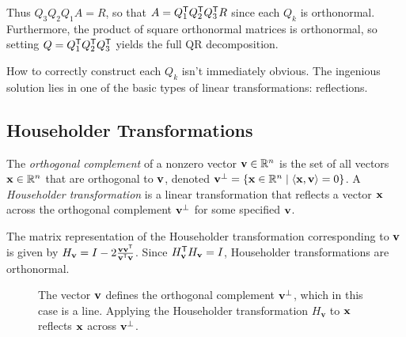 Thus $Q_3 Q_2 Q_1 A = R$, so that $A = Q_1^{\mathsf T} Q_2^{\mathsf T} Q_3^{\mathsf T} R$ since each $Q_k$ is orthonormal.
Furthermore, the product of square orthonormal matrices is orthonormal, so setting $Q = Q_1^{\mathsf T} Q_2^{\mathsf T} Q_3^{\mathsf T}$ yields the full QR decomposition.

How to correctly construct each $Q_k$ isn't immediately obvious.
The ingenious solution lies in one of the basic types of linear transformations: reflections.

\subsection*{Householder Transformations} %

The \emph{orthogonal complement} of a nonzero vector $\mathbf{v} \in \mathbb{R}^n$ is the set of all vectors $\mathbf{x} \in \mathbb{R}^n$ that are orthogonal to $\mathbf{v}$, denoted $\mathbf{v}^\perp = \{ \mathbf{x} \in \mathbb{R}^n \mid \langle \mathbf{x}, \mathbf{v} \rangle = 0 \}$.
A \emph{Householder transformation} is a linear transformation that reflects a vector $\mathbf{x}$ across the orthogonal complement $\mathbf{v}^\perp$ for some specified $\mathbf{v}$.

The matrix representation of the Householder transformation corresponding to $\mathbf{v}$ is given by $H_{\mathbf{v}} = I - 2\frac{\mathbf{v}\mathbf{v}^{\mathsf T}}{\mathbf{v}^{\mathsf T}\mathbf{v}}$.
Since $H_{\mathbf{v}}^{\mathsf T} H_{\mathbf{v}} = I$, Householder transformations are orthonormal.

\begin{figure}[H]
\centering
{}
\caption{The vector $\mathbf{v}$ defines the orthogonal complement $\mathbf{v}^\perp$, which in this case is a line.
Applying the Householder transformation $H_{\mathbf{v}}$ to $\mathbf{x}$ reflects $\mathbf{x}$ across $\mathbf{v}^\perp$.}
\label{fig:Householder_reflector}
\end{figure}

